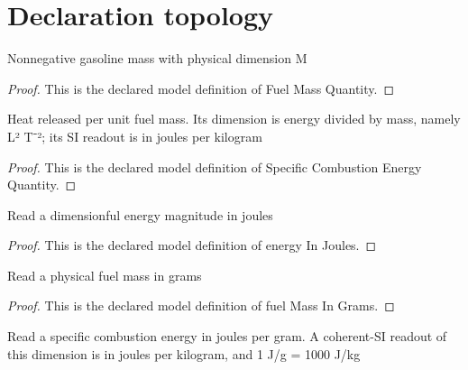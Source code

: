 \section{Declaration topology}
\begin{definition}
  \label{def:physics:phyx-mini-0473:phyxminiproblems-problemphyxmini0473-fuelmassquantity}
  Nonnegative gasoline mass with physical dimension M
\end{definition}
\begin{proof}
  This is the declared model definition of Fuel Mass Quantity.
\end{proof}
\begin{definition}
  \label{def:physics:phyx-mini-0473:phyxminiproblems-problemphyxmini0473-specificcombustionenergyquantity}
  Heat released per unit fuel mass. Its dimension is energy divided by mass, namely L² T⁻²; its SI readout is in joules per kilogram
\end{definition}
\begin{proof}
  This is the declared model definition of Specific Combustion Energy Quantity.
\end{proof}
\begin{definition}
  \label{def:physics:phyx-mini-0473:phyxminiproblems-problemphyxmini0473-energyinjoules}
  Read a dimensionful energy magnitude in joules
\end{definition}
\begin{proof}
  This is the declared model definition of energy In Joules.
\end{proof}
\begin{definition}
  \label{def:physics:phyx-mini-0473:phyxminiproblems-problemphyxmini0473-fuelmassingrams}
  Read a physical fuel mass in grams
\end{definition}
\begin{proof}
  This is the declared model definition of fuel Mass In Grams.
\end{proof}
\begin{definition}
  \label{def:physics:phyx-mini-0473:phyxminiproblems-problemphyxmini0473-combustionenergyinjoulespergram}
  Read a specific combustion energy in joules per gram. A coherent-SI readout of this dimension is in joules per kilogram, and 1 J/g = 1000 J/kg
\end{definition}
